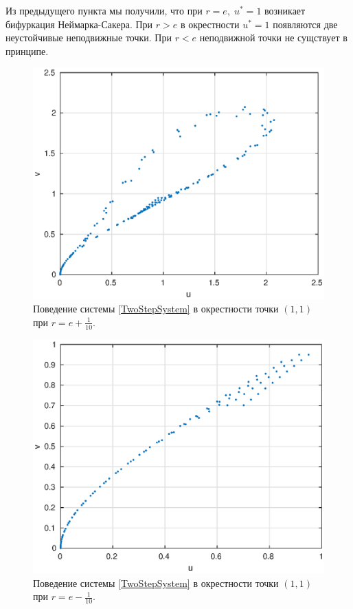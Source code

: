             Из предыдущего пункта мы получили, что при $r = e,\; u^* = 1$ возникает бифуркация Неймарка-Сакера. При $r > e$ в окрестности $u^* = 1$ появляются две неустойчивые неподвижные точки. При $r < e$ неподвижной точки не сущствует в принципе.
            \begin{figure}[h!]
                \centering
                \includegraphics[width=0.8\linewidth]{img/two_step_bifurcation_gt.eps}
                \caption{Поведение системы \ref{TwoStepSystem} в окрестности точки $(1, 1)$ при $r = e + \frac{1}{10}$.}
                \label{img:two_step_bifurcation_gt}
            \end{figure}
                        \begin{figure}[h!]
                \centering
                \includegraphics[width=0.8\linewidth]{img/two_step_bifurcation_lt.eps}
                \caption{Поведение системы \ref{TwoStepSystem} в окрестности точки $(1, 1)$ при $r = e - \frac{1}{10}$.}
                \label{img:two_step_bifurcation_lt}
            \end{figure}